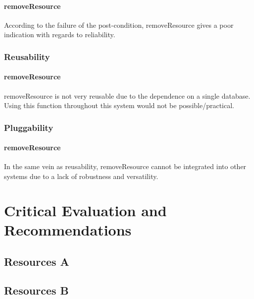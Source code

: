 \documentclass[a4paper]{article}
\begin{document}
\paragraph{removeResource}
According to the failure of the post-condition, removeResource gives a poor indication with regards to reliability.

\subsubsection {Reusability}

\paragraph{removeResource}
removeResource is not very reusable due to the dependence on a single database. Using this function throughout this system would not be possible/practical.

\subsubsection {Pluggability}

\paragraph{removeResource}
In the same vein as reusability, removeResource cannot be integrated into other systems due to a lack of robustness and versatility.


\section {Critical Evaluation and Recommendations}
\subsection {Resources A}
\subsection {Resources B}
\end{document}
